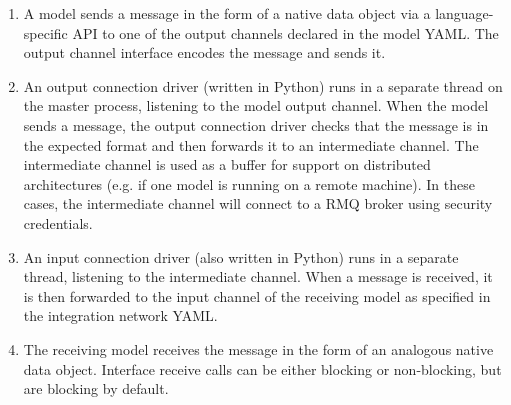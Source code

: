 \documentclass[journal]{IEEEtran}
\begin{document}
\begin{enumerate}
	\item A model sends a message in the form of a native data object via a language-specific API to one of the output channels declared in the model YAML. The output channel interface encodes the message and sends it.
	\item An output connection driver (written in Python) runs in a separate thread on the master process, listening to the model output channel. When the model sends a message, the output connection driver checks that the message is in the expected format and then forwards it to an intermediate channel. The intermediate channel is used as a buffer for support on distributed architectures (e.g. if one model is running on a remote machine). In these cases, the intermediate channel will connect to a RMQ broker using security credentials.
	\item An input connection driver (also written in Python) runs in a separate thread, listening to the intermediate channel. When a message is received, it is then forwarded to the input channel of the receiving model as specified in the integration network YAML.
	\item The receiving model receives the message in the form of an analogous native data object. Interface receive calls can be either blocking or non-blocking, but are blocking by default.
\end{enumerate}



\end{document}
